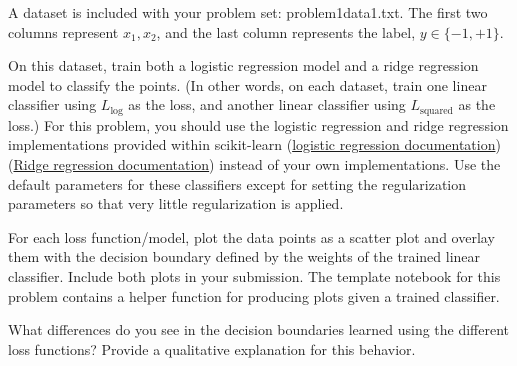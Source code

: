 \problem[9]
A dataset is included with your problem set: problem1data1.txt. The first two columns represent $x_1, x_2$, and the last column represents the label, $y \in \{-1,+1\}$.

On this dataset, train both a logistic regression model and a ridge regression model to classify the points.  (In other words, on each dataset, train one linear classifier using $L_\text{log}$ as the loss, and another linear classifier using $L_\text{squared}$ as the loss.) For this problem, you should use the logistic regression and ridge regression implementations provided within scikit-learn 
(\href{http://scikit-learn.org/stable/modules/generated/sklearn.linear_model.LogisticRegression.html}{logistic regression documentation})
(\href{http://scikit-learn.org/stable/modules/generated/sklearn.linear_model.Ridge.html}{Ridge regression documentation})
instead of your own implementations. Use the default parameters for these classifiers except for setting the regularization parameters so that very little regularization is applied.

For each loss function/model, plot the data points as a scatter plot and overlay them with the decision boundary defined by the weights of the trained linear classifier.  Include both plots in your submission. The template notebook for this problem contains a helper function for producing plots given a trained classifier.

What differences do you see in the decision boundaries learned using the different loss functions? Provide a qualitative explanation for this behavior.

